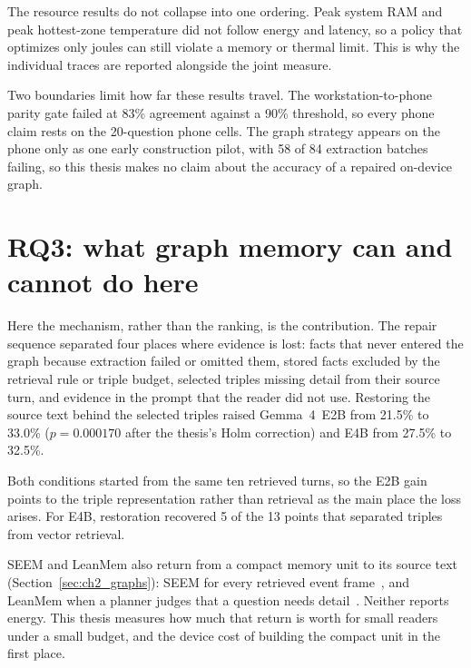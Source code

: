 The resource results do not collapse into one ordering. Peak system RAM and peak hottest-zone
temperature did not follow energy and latency, so a policy that optimizes only joules can still
violate a memory or thermal limit. This is why the individual traces are reported alongside the
joint measure.

Two boundaries limit how far these results travel. The workstation-to-phone parity gate failed at
83\% agreement against a 90\% threshold, so every phone claim rests on the 20-question phone
cells. The graph strategy appears on the phone only as one early construction pilot, with 58 of 84
extraction batches failing, so this thesis makes no claim about the accuracy of a repaired
on-device graph.

\section{RQ3: what graph memory can and cannot do here}
\label{sec:ch9_rq3}

Here the mechanism, rather than the ranking, is the contribution. The repair sequence separated
four places where evidence is lost: facts that never entered the graph because extraction failed or
omitted them, stored facts excluded by the retrieval rule or triple budget, selected triples missing
detail from their source turn, and evidence in the prompt that the reader did not use. Restoring the
source text behind the selected triples raised Gemma~4~E2B from 21.5\% to 33.0\% ($p=0.000170$ after
the thesis's Holm correction) and E4B from 27.5\% to 32.5\%.

Both conditions started from the same ten retrieved turns, so the E2B gain points to the triple
representation rather than retrieval as the main place the loss arises. For E4B, restoration
recovered 5 of the 13 points that separated triples from vector retrieval.

SEEM and LeanMem also return from a compact memory unit to its source text
(Section~\ref{sec:ch2_graphs}): SEEM for every retrieved event frame~\citep{seem}, and LeanMem when a
planner judges that a question needs detail~\citep{leanmem}. Neither reports energy. This thesis
measures how much that return is worth for small readers under a small budget, and the device cost of
building the compact unit in the first place.

